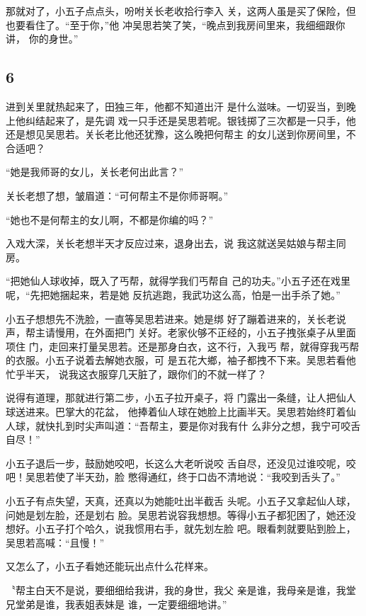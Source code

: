 那就对了，小五子点点头，吩咐关长老收拾行李入
关，这两人虽是买了保险，但也要看住了。“至于你，”他
冲吴思若笑了笑，“晚点到我房间里来，我细细跟你讲，
你的身世。”
\newline

{\centering\subsection{6}}

进到关里就热起来了，田独三年，他都不知道出汗
是什么滋味。一切妥当，到晚上他纠结起来了，是先调
戏一只手还是吴思若呢。银钱掷了三次都是一只手，他
还是想见吴思若。关长老比他还犹豫，这么晚把何帮主
的女儿送到你房间里，不合适吧？

“她是我师哥的女儿，关长老何出此言？”

关长老想了想，皱眉道：“可何帮主不是你师哥啊。”

“她也不是何帮主的女儿啊，不都是你编的吗？”

入戏大深，关长老想半天才反应过来，退身出去，说
我这就送吴姑娘与帮主同房。

“把她仙人球收掉，既入了丐帮，就得学我们丐帮自
己的功夫。”小五子还在戏里呢，“先把她捆起来，若是她
反抗逃跑，我武功这么高，怕是一出手杀了她。”

小五子想想先不洗脸，一直等吴思若进来。她是绑
好了蹦着进来的，关长老说声，帮主请慢用，在外面把门
关好。老家伙够不正经的，小五子拽张桌子从里面项住
门，走回来打量吴思若。还是那身白衣，这不行，入我丐
帮，就得穿我丐帮的衣服。小五子说着去解她衣服，可
是五花大鄉，袖子都拽不下来。吴思若看他忙乎半天，
说我这衣服穿几天脏了，跟你们的不就一样了？

说得有道理，那就进行第二步，小五子拉开桌子，将
门露出一条缝，让人把仙人球送进来。巴掌大的花盆，
他捧着仙人球在她脸上比画半天。吴思若始终盯着仙
人球，就快扎到时尖声叫道：“吾帮主，要是你对我有什
么非分之想，我宁可咬舌自尽！”

小五子退后一步，鼓励她咬吧，长这么大老听说咬
舌自尽，还没见过谁咬呢，咬吧！吴思若使了半天劲，脸
憋得通红，终于口齿不清地说：“我咬到舌头了。”

小五子有点失望，天真，还真以为她能吐出半截舌
头呢。小五子又拿起仙人球，问她是划左脸，还是划右
脸。吴思若说容我想想。等得小五子都犯困了，她还没
想好。小五子打个哈久，说我惯用右手，就先划左脸
吧。眼看刺就要贴到脸上，吴思若高喊：“且慢！”

又怎么了，小五子看她还能玩出点什么花样来。

〝帮主白天不是说，要细细给我讲，我的身世，我父
亲是谁，我母亲是谁，我堂兄堂弟是谁，我表姐表妹是
谁，一定要细细地讲。”

